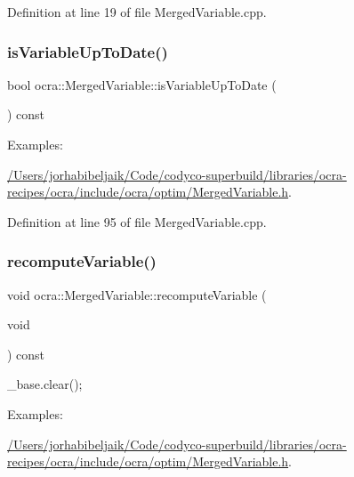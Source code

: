 Definition at line 19 of file Merged\+Variable.\+cpp.

\hypertarget{classocra_1_1MergedVariable_a1da61e970d1c32c9ad94da57914d5aeb}{}\label{classocra_1_1MergedVariable_a1da61e970d1c32c9ad94da57914d5aeb} 
\subsubsection{\texorpdfstring{is\+Variable\+Up\+To\+Date()}{isVariableUpToDate()}}
{\footnotesize\ttfamily bool ocra\+::\+Merged\+Variable\+::is\+Variable\+Up\+To\+Date (\begin{DoxyParamCaption}{ }\end{DoxyParamCaption}) const}

\begin{Desc}
\item[Examples\+: ]\par
\hyperlink{_2Users_2jorhabibeljaik_2Code_2codyco-superbuild_2libraries_2ocra-recipes_2ocra_2include_2ocra_27dfe52ed2d2fe1904154f5be9150e8b1}{/\+Users/jorhabibeljaik/\+Code/codyco-\/superbuild/libraries/ocra-\/recipes/ocra/include/ocra/optim/\+Merged\+Variable.\+h}.\end{Desc}


Definition at line 95 of file Merged\+Variable.\+cpp.

\hypertarget{classocra_1_1MergedVariable_a5edb99e2c6596addb6b5a1c991f79699}{}\label{classocra_1_1MergedVariable_a5edb99e2c6596addb6b5a1c991f79699} 
\subsubsection{\texorpdfstring{recompute\+Variable()}{recomputeVariable()}}
{\footnotesize\ttfamily void ocra\+::\+Merged\+Variable\+::recompute\+Variable (\begin{DoxyParamCaption}\item[{void}]{ }\end{DoxyParamCaption}) const}

\+\_\+base.\+clear(); \begin{Desc}
\item[Examples\+: ]\par
\hyperlink{_2Users_2jorhabibeljaik_2Code_2codyco-superbuild_2libraries_2ocra-recipes_2ocra_2include_2ocra_27dfe52ed2d2fe1904154f5be9150e8b1}{/\+Users/jorhabibeljaik/\+Code/codyco-\/superbuild/libraries/ocra-\/recipes/ocra/include/ocra/optim/\+Merged\+Variable.\+h}.\end{Desc}


